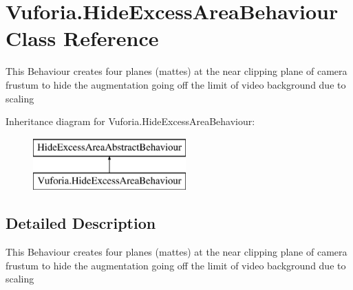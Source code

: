\hypertarget{class_vuforia_1_1_hide_excess_area_behaviour}{}\section{Vuforia.\+Hide\+Excess\+Area\+Behaviour Class Reference}
\label{class_vuforia_1_1_hide_excess_area_behaviour}


This Behaviour creates four planes (mattes) at the near clipping plane of camera frustum to hide the augmentation going off the limit of video background due to scaling  


Inheritance diagram for Vuforia.\+Hide\+Excess\+Area\+Behaviour\+:\begin{figure}[H]
\begin{center}
\leavevmode
\includegraphics[height=2.000000cm]{class_vuforia_1_1_hide_excess_area_behaviour}
\end{center}
\end{figure}


\subsection{Detailed Description}
This Behaviour creates four planes (mattes) at the near clipping plane of camera frustum to hide the augmentation going off the limit of video background due to scaling 

